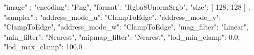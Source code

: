 {
    "image" : {
        "encoding": "Png",
        "format": "Rgba8UnormSrgb",
        "size": [
            128,
            128
        ]
    },
    "sampler" : {
        "address_mode_u": "ClampToEdge",
        "address_mode_v": "ClampToEdge",
        "address_mode_w": "ClampToEdge",
        "mag_filter": "Linear",
        "min_filter": "Nearest",
        "mipmap_filter": "Nearest",
        "lod_min_clamp": 0.0,
        "lod_max_clamp": 100.0
    }
}